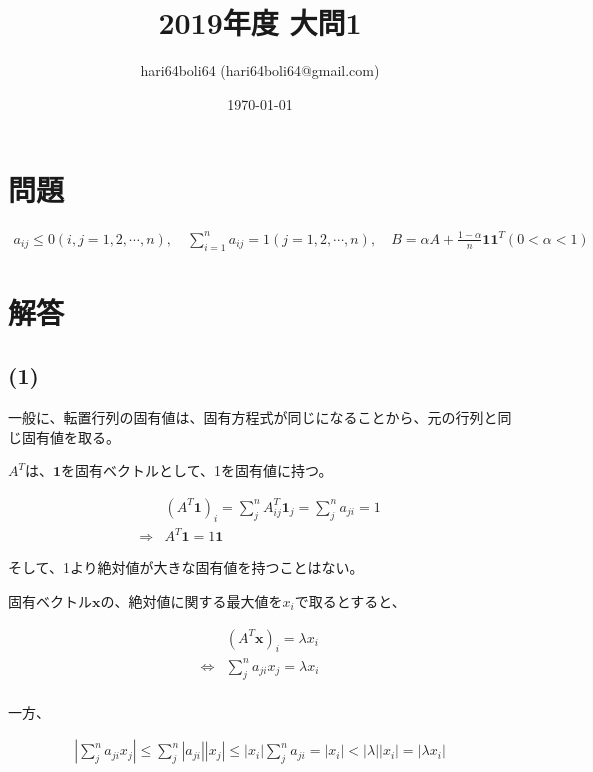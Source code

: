 \documentclass[a4paper, 10pt, dvipdfmx]{jlreq}
\begin{document}
\title{2019年度 大問1}
\author{hari64boli64 (hari64boli64@gmail.com)}
\date{\today}
\maketitle


\section{問題}

\begin{align*}
  a_{ij} \leq 0 (i,j = 1,2,\cdots,n), \quad \sum_{i=1}^{n}a_{ij}=1 (j=1,2,\cdots,n),  \quad B=\alpha A+\frac{1-\alpha}{n}\bm{1}\bm{1}^T (0<\alpha<1)
\end{align*}

\section{解答}

\subsection*{(1)}

一般に、転置行列の固有値は、固有方程式が同じになることから、元の行列と同じ固有値を取る。

$A^T$は、$\bm{1}$を固有ベクトルとして、1を固有値に持つ。

\begin{align*}
              & (A^T\bm{1})_i=\sum_{j}^n A^T_{ij}\bm{1}_j=\sum_{j}^na_{ji}=1 \\
  \Rightarrow & A^T\bm{1}=1\bm{1}
\end{align*}

そして、1より絶対値が大きな固有値を持つことはない。

固有ベクトル$\bm{x}$の、絶対値に関する最大値を$x_i$で取るとすると、

\begin{align*}
                  & (A^T\bm{x})_i =\lambda x_i        \\
  \Leftrightarrow & \sum_{j}^n a_{ji}x_j =\lambda x_i \\
\end{align*}

一方、

\begin{align*}
  \left|\sum_{j}^n a_{ji}x_j\right|\leq \sum_{j}^n |a_{ji}||x_j| \leq |x_i|\sum_{j}^n a_{ji} = |x_i| < |\lambda||x_i|=|\lambda x_i|
\end{align*}
\end{document}
